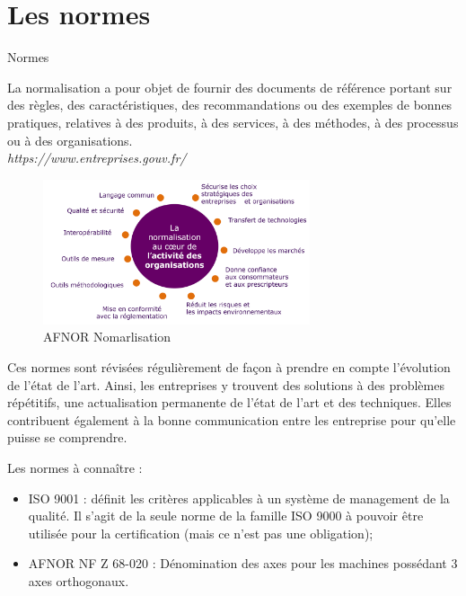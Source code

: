 \documentclass[
	11pt, %
	fleqn, %
	a4paper, %
]{LegrandOrangeBook}
\begin{document}
\section{Les normes}
\begin{definition}{Normes}

    La normalisation a pour objet de fournir des documents de référence portant sur des règles, des caractéristiques, des recommandations ou des exemples de bonnes pratiques, relatives à des produits, à des services, à des méthodes, à des processus ou à des organisations.\\ \textit{https://www.entreprises.gouv.fr/}
\end{definition}

\begin{figure}[H] %
	\centering %
	\includegraphics[width=0.7\textwidth]{normes.PNG} %
	\caption{AFNOR Nomarlisation}
	\label{fig:placeholder} %
\end{figure}

Ces normes sont révisées régulièrement de façon à prendre en compte l’évolution de l’état de l’art. Ainsi, les entreprises y trouvent des solutions à des problèmes répétitifs, une actualisation permanente de l'état de l'art et des techniques. Elles contribuent également à la bonne communication entre les entreprise pour qu'elle puisse se comprendre.

Les normes à connaître :
\begin{itemize}
    \item ISO 9001 : définit les critères applicables à un système de management de la qualité. Il s’agit de la seule norme de la famille ISO 9000 à pouvoir être utilisée pour la certification (mais ce n’est pas une obligation);
    \item AFNOR NF Z 68-020 : Dénomination des axes pour les machines possédant 3 axes orthogonaux.
\end{itemize}
\end{document}
